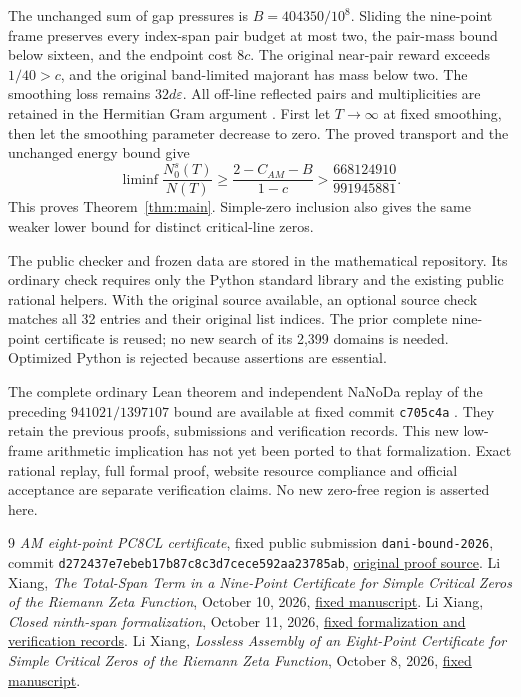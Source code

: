 \documentclass[11pt,a4paper]{article}
\begin{document}
The unchanged sum of gap pressures is $B=404350/10^8$. Sliding the
nine-point frame preserves every index-span pair budget at most two,
the pair-mass bound below sixteen, and the endpoint cost $8c$.
The original near-pair reward exceeds $1/40>c$, and the original
band-limited majorant has mass below two. The smoothing loss remains
$32d\varepsilon$. All off-line reflected pairs and multiplicities
are retained in the Hermitian Gram argument \cite{Ninth,Lossless}.
First let $T\to\infty$ at fixed smoothing, then let the smoothing
parameter decrease to zero. The proved transport and the unchanged
energy bound give
\[
 \liminf\frac{N_0^s(T)}{N(T)}
 \ge\frac{2-C_{AM}-B}{1-c}
 >\frac{668124910}{991945881}.
\]
This proves Theorem~\ref{thm:main}. Simple-zero inclusion also gives
the same weaker lower bound for distinct critical-line zeros.

The public checker and frozen data are stored in the mathematical
repository. Its ordinary check requires only the Python standard
library and the existing public rational helpers. With the original
source available, an optional source check matches all 32 entries
and their original list indices. The prior complete nine-point
certificate is reused; no new search of its 2,399 domains is needed.
Optimized Python is rejected because assertions are essential.

The complete ordinary Lean theorem and independent NaNoDa replay of
the preceding $941021/1397107$ bound are available at fixed commit
\texttt{c705c4a} \cite{Formal}.
They retain the previous proofs, submissions and verification records.
This new low-frame arithmetic implication has not yet been ported
to that formalization. Exact rational replay, full formal proof,
website resource compliance and official acceptance are separate
verification claims. No new zero-free region is asserted here.

\begin{thebibliography}{9}
\emph{AM eight-point PC8CL certificate}, fixed public submission
\texttt{dani-bound-2026}, commit
\texttt{d272437e7ebeb17b87c8c3d7cece592aa23785ab},
\href{https://github.com/josusanmartin/riemann/tree/d272437e7ebeb17b87c8c3d7cece592aa23785ab/submissions/dani-bound-2026/proof}{original proof source}.
Li Xiang, \emph{The Total-Span Term in a Nine-Point Certificate
for Simple Critical Zeros of the Riemann Zeta Function}, October 10, 2026,
\href{https://github.com/lixiang90/RH-Weil/blob/2d2eb99b82f944b23437cd88797cdfd178021fb0/papers/ninth-span-simple-critical-paper.tex}{fixed manuscript}.
Li Xiang, \emph{Closed ninth-span formalization}, October 11, 2026,
\href{https://github.com/lixiang90/RH-Zero-Proportion-Formalization/tree/c705c4aad2ad33e5358ce17e906b0dc51b1a83fe}{fixed formalization and verification records}.
Li Xiang, \emph{Lossless Assembly of an Eight-Point Certificate
for Simple Critical Zeros of the Riemann Zeta Function}, October 8, 2026,
\href{https://github.com/lixiang90/RH-Weil/blob/0f7e6c21769b7a848fc9ce4cbf498eb91184874d/papers/lossless-eight-point-simple-critical-paper.tex}{fixed manuscript}.
\end{thebibliography}
\end{document}
